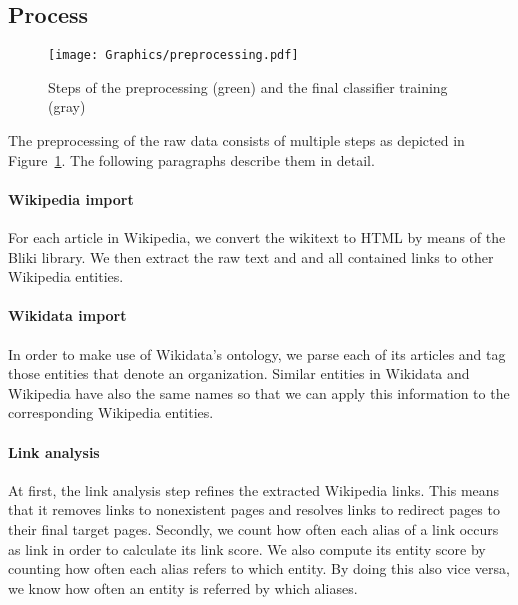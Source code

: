 \subsection{Process}
\begin{figure}[ht]
	\centering
  \texttt{[image: Graphics/preprocessing.pdf]}
	\caption{Steps of the preprocessing (green) and the final classifier training (gray)}
	\label{fig:preprocessing}
\end{figure}

The preprocessing of the raw data consists of multiple steps as depicted in Figure~\ref{fig:preprocessing}. The following paragraphs describe them in detail.


\paragraph{Wikipedia import}
For each article in Wikipedia, we convert the wikitext to HTML by means of the Bliki library\footnotemark{}. We then extract the raw text and and all contained links to other Wikipedia entities.


\paragraph{Wikidata import}
In order to make use of Wikidata's ontology, we parse each of its articles and tag those entities that denote an organization. Similar entities in Wikidata and Wikipedia have also the same names so that we can apply this information to the corresponding Wikipedia entities.


\paragraph{Link analysis}
At first, the link analysis step refines the extracted Wikipedia links. This means that it removes links to nonexistent pages and resolves links to redirect pages to their final target pages. Secondly, we count how often each alias of a link occurs as link in order to calculate its link score. We also compute its entity score by counting how often each alias refers to which entity. By doing this also vice versa, we know how often an entity is referred by which aliases.



